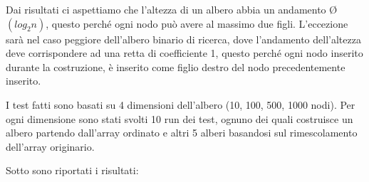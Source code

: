 \documentclass[a4paper, 11pt]{article}
\begin{document}
\vspace{0,5 cm}
Dai risultati ci aspettiamo che l'altezza di un albero abbia un andamento \O$(log_2{n})$, questo perché ogni nodo può avere al massimo due figli. L'eccezione sarà nel caso peggiore dell'albero binario di ricerca, dove l'andamento dell'altezza deve corrispondere ad una retta di coefficiente 1, questo perché ogni nodo inserito durante la costruzione, è inserito come figlio destro del nodo precedentemente inserito.

\vspace{0,5 cm}
I test fatti sono basati su 4 dimensioni dell'albero (10, 100, 500, 1000 nodi). Per ogni dimensione sono stati svolti 10 run dei test, ognuno dei quali costruisce un albero partendo dall'array ordinato e altri 5 alberi basandosi sul rimescolamento dell'array originario.

\vspace{0,5 cm}
Sotto sono riportati i risultati:
\end{document}
